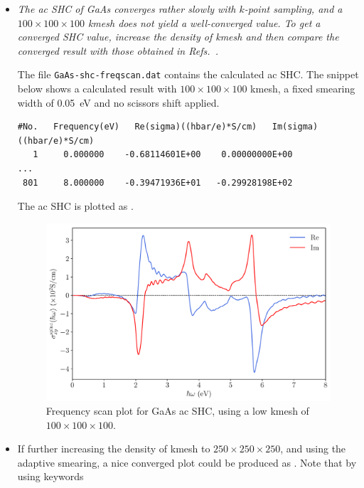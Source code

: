 \begin{itemize}
	\item {\it The ac SHC of GaAs converges rather slowly with $k$-point sampling, and a $100 \times 100 \times 100$ kmesh does not yield a well-converged value.
	To get a converged SHC value, increase the density of kmesh and then compare the converged result with those obtained in Refs.~.}

	The file {\tt GaAs-shc-freqscan.dat} contains the calculated ac SHC.
	The snippet below shows a calculated result with
	$100\times100\times100$ kmesh,
	a fixed smearing width of 0.05~eV and no scissors shift applied.

\begin{tcolorbox}[title=$100\times100\times100$ kmesh,sharp corners,boxrule=0.5pt]
{\small
\begin{verbatim}
#No.   Frequency(eV)   Re(sigma)((hbar/e)*S/cm)   Im(sigma)((hbar/e)*S/cm)
   1     0.000000    -0.68114601E+00    0.00000000E+00
...
 801     8.000000    -0.39471936E+01   -0.29928198E+02
\end{verbatim}
}
\end{tcolorbox}

The ac SHC is plotted as .
\begin{figure}[htb!]
\centering
\includegraphics[width=.8\columnwidth]{figure/example30/gaas_freqscan_100kpt.pdf}
\caption{Frequency scan plot for GaAs ac SHC, using
	a low kmesh of $100\times100\times100$.}
\label{fig30.1}
\end{figure}

\item If further increasing the density of kmesh to
$250\times250\times250$, and using the adaptive smearing,
a nice converged plot could be produced as .
Note that by using keywords 
\end{itemize}
